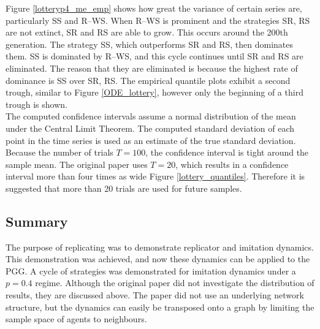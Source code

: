 \FloatBarrier
\FloatBarrier
Figure \ref{lotteryp4_me_emp} shows how great the variance of certain series are, particularly SS and R--WS. When R--WS is prominent and the strategies SR, RS are not extinct, SR and RS are able to grow. This occurs around the 200th generation. The strategy SS, which outperforms SR and RS, then dominates them. SS is dominated by R--WS, and this cycle continues until SR and RS are eliminated. The reason that they are eliminated is because the highest rate of dominance is SS over SR, RS. The empirical quantile plots exhibit a second trough, similar to Figure \ref{ODE_lottery}, however only the beginning of a third trough is shown.  \\
\FloatBarrier
{}
\FloatBarrier
 The computed confidence intervals assume a normal distribution of the mean under the Central Limit Theorem. The computed standard deviation of each point in the time series is used as an estimate of the true standard deviation. Because the number of trials $T=100$, the confidence interval is tight around the sample mean. The original paper uses $T=20$, which results in a confidence interval more than four times as wide Figure \ref{lottery_quantiles}. Therefore it is suggested that more than 20 trials are used for future samples. \\



\subsection{Summary}
The purpose of replicating \cite{RN30} was to demonstrate replicator and imitation dynamics. This demonstration was achieved, and now these dynamics can be applied to the PGG. A cycle of strategies was demonstrated for imitation dynamics under a $p=0.4$ regime. Although the original paper did not investigate the distribution of results, they are discussed above. The paper \cite{RN30} did not use an underlying network structure, but the dynamics can easily be transposed onto a graph by limiting the sample space of agents to neighbours. \\


